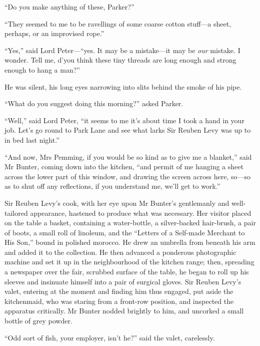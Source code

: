 \enquote{Do you make anything of these, Parker?}

\enquote{They seemed to me to be ravellings of some coarse cotton stuff\allowbreak---\allowbreak a sheet, perhaps, or an improvised rope.}

\enquote{Yes,} said Lord Peter---\enquote{yes. It may be a mistake\allowbreak---\allowbreak it may be \textit{our} mistake. I wonder. Tell me, d’you think these tiny threads are long enough and strong enough to hang a man?}

He was silent, his long eyes narrowing into slits behind the smoke of his pipe.

\enquote{What do you suggest doing this morning?} asked Parker.

\enquote{Well,} said Lord Peter, \enquote{it seems to me it’s about time I took a hand in your job. Let’s go round to Park Lane and see what larks Sir Reuben Levy was up to in bed last night.}

\enquote{And now, Mrs Pemming, if you would be so kind as to give me a blanket,} said Mr Bunter, coming down into the kitchen, \enquote{and permit of me hanging a sheet across the lower part of this window, and drawing the screen across here, so\allowbreak---\allowbreak so as to shut off any reflections, if you understand me, we’ll get to work.}

Sir Reuben Levy’s cook, with her eye upon Mr Bunter’s gentlemanly and well-tailored appearance, hastened to produce what was necessary. Her visitor placed on the table a basket, containing a water-bottle, a silver-backed hair-brush, a pair of boots, a small roll of linoleum, and the \enquote{Letters of a Self-made Merchant to His Son,} bound in polished morocco. He drew an umbrella from beneath his arm and added it to the collection. He then advanced a ponderous photographic machine and set it up in the neighbourhood of the kitchen range; then, spreading a newspaper over the fair, scrubbed surface of the table, he began to roll up his sleeves and insinuate himself into a pair of surgical gloves. Sir Reuben Levy’s valet, entering at the moment and finding him thus engaged, put aside the kitchenmaid, who was staring from a front-row position, and inspected the apparatus critically. Mr Bunter nodded brightly to him, and uncorked a small bottle of grey powder.

\enquote{Odd sort of fish, your employer, isn’t he?} said the valet, carelessly.

